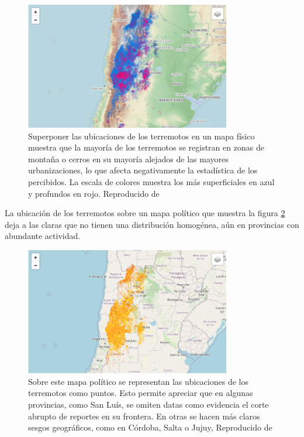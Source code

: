 \documentclass[a4paper]{report}
\begin{document}
\begin{figure}[!ht]
\centering
\includegraphics[width=0.8\textwidth]{mapa_sismos.png}
\caption{Superponer las ubicaciones de los terremotos en un mapa físico muestra que la mayoría de los terremotos se registran en zonas de montaña o cerros en su mayoría alejados de las mayores urbanizaciones, lo que afecta negativamente la estadística de los percibidos.
La escala de colores muestra los más superficiales en azul y profundos en rojo.
Reproducido de \cite{daniela_parada_ic-datasets-docencia_nodate}}
\label{fig:mapa_sismos}
\end{figure}

La ubicación de los terremotos sobre un mapa político que muestra la figura \ref{fig:terremotosMapa} deja a las claras que no tienen una distribución homogénea, aún en provincias con abundante actividad.

\begin{figure}[!ht]
\centering
\includegraphics[width=0.8\textwidth]{terremotosMapa.png}
\caption{Sobre este mapa político se representan las ubicaciones de los terremotos como puntos. Esto permite apreciar que en algunas provincias, como San Luís, se omiten datas como evidencia el corte abrupto de reportes en su frontera. En otras se hacen más claros sesgos geográficos, como en Córdoba, Salta o Jujuy, 
Reproducido de \cite{daniela_parada_ic-datasets-docencia_nodate}}
\label{fig:terremotosMapa}
\end{figure}
\end{document}

